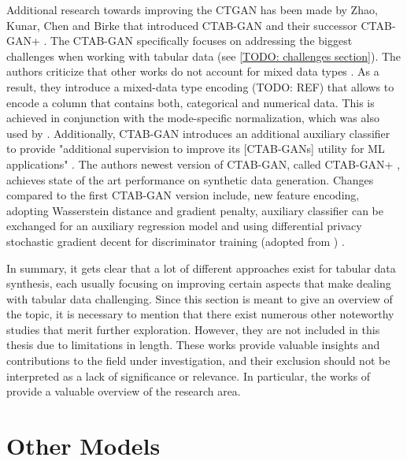 Additional research towards improving the CTGAN has been made by Zhao, Kunar, Chen and Birke that introduced CTAB-GAN \cite{zhao2021CTABGANEffectiveTablea} and their successor CTAB-GAN+ \cite{zhao2022CTABGANEnhancingTabular}.
The CTAB-GAN specifically focuses on addressing the biggest challenges when working with tabular data (see \autoref{TODO: challenges section}).
The authors criticize that other works do not account for mixed data types \cite{zhao2022CTABGANEnhancingTabular}.
As a result, they introduce a mixed-data type encoding (TODO: REF) that allows to encode a column that contains both, categorical and numerical data.
This is achieved in conjunction with the mode-specific normalization, which was also used by \cite{xu2018SynthesizingTabularData, xu2019ModelingTabularData}.
Additionally, CTAB-GAN introduces an additional auxiliary classifier to provide "additional supervision to improve its [CTAB-GANs] utility for ML applications" \cite[p. 2]{zhao2021CTABGANEffectiveTablea}.
The authors newest version of CTAB-GAN, called CTAB-GAN+ \cite{zhao2022CTABGANEnhancingTabular}, achieves state of the art performance on synthetic data generation.
Changes compared to the first CTAB-GAN version include, new feature encoding, adopting Wasserstein distance and gradient penalty, auxiliary classifier can be exchanged for an auxiliary regression model
and using differential privacy stochastic gradient decent \cite{abadi2016DeepLearningDifferentiala} for discriminator training (adopted from \cite{jordon2018PATEGANGeneratingSynthetic}) \cite{zhao2022CTABGANEnhancingTabular}.

In summary, it gets clear that a lot of different approaches exist for tabular data synthesis, each usually focusing on improving certain aspects that make dealing with tabular data challenging.
Since this section is meant to give an overview of the topic, 
it is necessary to mention that there exist numerous other noteworthy studies that merit further exploration. 
However, they are not included in this thesis due to limitations in length. 
These works provide valuable insights and contributions to the field under investigation, and their exclusion should not be interpreted as a lack of significance or relevance. 
In particular, the works of \cite{fan2020RelationalDataSynthesisa, hernandez2022SyntheticDataGeneration, bourou2021ReviewTabularData} provide a valuable overview of the research area.


\section{Other Models}
\label{ch:relatedWork-Other Models}

